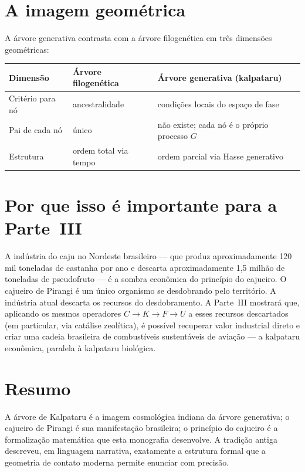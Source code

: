 \documentclass[12pt,a4paper,twoside]{book}
\theoremstyle{plain}
\theoremstyle{definition}
\theoremstyle{definition}
\begin{document}
\section{A imagem geométrica}

A árvore generativa contrasta com a árvore filogenética em três
dimensões geométricas:

\begin{center}
\begin{tabular}{p{}p{}p{}}
\toprule
\textbf{Dimensão} & \textbf{Árvore filogenética} & \textbf{Árvore generativa (kalpataru)} \\
\midrule
Critério para nó & ancestralidade & condições locais do espaço de fase \\
Pai de cada nó & único & não existe; cada nó é o próprio processo $G$ \\
Estrutura & ordem total via tempo & ordem parcial via Hasse generativo \\
\bottomrule
\end{tabular}
\end{center}

\section{Por que isso é importante para a Parte~III}

A indústria do caju no Nordeste brasileiro --- que produz aproximadamente
120 mil toneladas de castanha por ano e descarta aproximadamente 1,5
milhão de toneladas de pseudofruto --- é a sombra econômica do princípio
do cajueiro. O cajueiro de Pirangi é um único organismo se desdobrando
pelo território. A indústria atual descarta os recursos do desdobramento.
A Parte~III mostrará que, aplicando os mesmos operadores
$C \to K \to F \to U$ a esses recursos descartados (em particular,
via catálise zeolítica), é possível recuperar valor industrial direto e
criar uma cadeia brasileira de combustíveis sustentáveis de aviação ---
a kalpataru econômica, paralela à kalpataru biológica.

\section{Resumo}

A árvore de Kalpataru é a imagem cosmológica indiana da árvore generativa;
o cajueiro de Pirangi é sua manifestação brasileira; o princípio do
cajueiro é a formalização matemática que esta monografia desenvolve.
A tradição antiga descreveu, em linguagem narrativa, exatamente a
estrutura formal que a geometria de contato moderna permite enunciar
com precisão.
\end{document}
